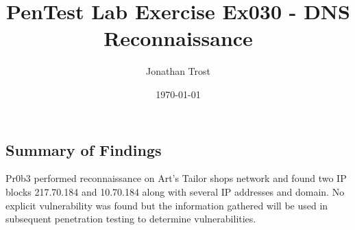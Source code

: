 \documentclass[notitlepage]{article}
\begin{document}
	
	
	\title{PenTest Lab Exercise Ex030 - DNS Reconnaissance}
	\author{Jonathan Trost}
	\date{\isodate\today}
	
	\maketitle
	
	\tableofcontents
	
	\newpage
	
	\subsection{Summary of Findings}
	\indent Pr0b3 performed reconnaissance on Art's Tailor shops network and found two IP blocks 217.70.184 and 10.70.184 along with several IP addresses and domain.  No explicit vulnerability was found but the information gathered will be used in subsequent penetration testing to determine vulnerabilities.   
	
\end{document}
